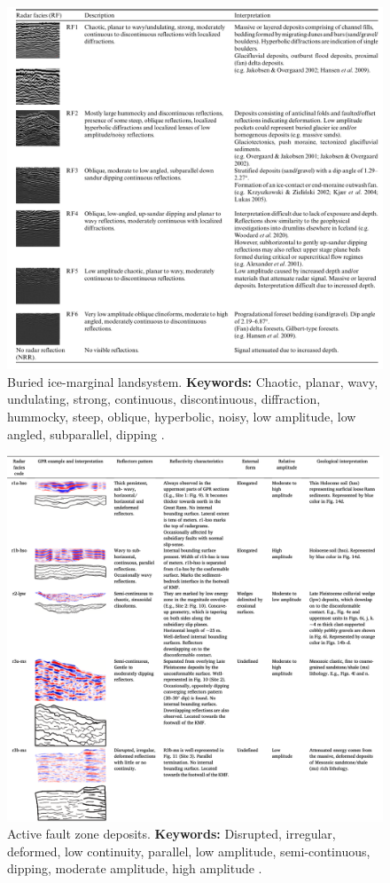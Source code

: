 \begin{figure}[h!]
    \centering
    \includegraphics[width=0.9\linewidth]{Figures/0.2GPR/Harrison2022_IceMargin.png}
    \caption[Buried ice-marginal landsystem.]{Buried ice-marginal landsystem. \textbf{Keywords: } Chaotic, planar, wavy, undulating, strong, continuous, discontinuous, diffraction, hummocky, steep, oblique, hyperbolic, noisy, low amplitude, low angled, subparallel, dipping \citep{Harrison2022}.}
    \label{fig:Harrison2022-1}
\end{figure}


\begin{figure}[h!]
    \centering
    \includegraphics[width=0.9\linewidth]{Figures/0.2GPR/Shaikh2022_fault_1.png}
    \caption[Active fault zone deposits.]{Active fault zone deposits. \textbf{Keywords: } Disrupted, irregular, deformed, low continuity, parallel, low amplitude, semi-continuous, dipping, moderate amplitude, high amplitude \citep{Shaikh2022}.}
    \label{fig:Shaikh2022-1}
\end{figure}

